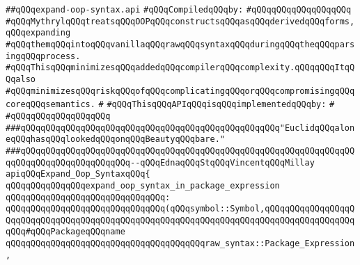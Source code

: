 \label{src/lib/compiler/front/typer/main/expand-oop-syntax.api}
\verb|##qQQqexpand-oop-syntax.api|\newline
\newline
\verb|#qQQqCompiledqQQqby:|\newline
\verb|#qQQqqQQqqQQqqQQqqQQq|\newline
\newline
\verb|#qQQqMythrylqQQqtreatsqQQqOOPqQQqconstructsqQQqasqQQqderivedqQQqforms,qQQqexpanding|\newline
\verb|#qQQqthemqQQqintoqQQqvanillaqQQqrawqQQqsyntaxqQQqduringqQQqtheqQQqparsingqQQqprocess.|\newline
\verb|#qQQqThisqQQqminimizesqQQqaddedqQQqcompilerqQQqcomplexity.qQQqqQQqItqQQqalso|\newline
\verb|#qQQqminimizesqQQqriskqQQqofqQQqcomplicatingqQQqorqQQqcompromisingqQQqcoreqQQqsemantics.|\newline
\verb|#|\newline
\verb|#qQQqThisqQQqAPIqQQqisqQQqimplementedqQQqby:|\newline
\verb|#|\newline
\verb|#qQQqqQQqqQQqqQQqqQQq|\newline
\newline
\newline
\verb|###qQQqqQQqqQQqqQQqqQQqqQQqqQQqqQQqqQQqqQQqqQQqqQQqqQQq"EuclidqQQqaloneqQQqhasqQQqlookedqQQqonqQQqBeautyqQQqbare."|\newline
\verb|###qQQqqQQqqQQqqQQqqQQqqQQqqQQqqQQqqQQqqQQqqQQqqQQqqQQqqQQqqQQqqQQqqQQqqQQqqQQqqQQqqQQqqQQqqQQq--qQQqEdnaqQQqStqQQqVincentqQQqMillay|\newline
\newline
\newline
\verb|apiqQQqExpand_Oop_SyntaxqQQq{|\newline
\newline
\verb|qQQqqQQqqQQqqQQqexpand_oop_syntax_in_package_expression|\newline
\verb|qQQqqQQqqQQqqQQqqQQqqQQqqQQqqQQq:|\newline
\verb|qQQqqQQqqQQqqQQqqQQqqQQqqQQqqQQq(qQQqsymbol::Symbol,qQQqqQQqqQQqqQQqqQQqqQQqqQQqqQQqqQQqqQQqqQQqqQQqqQQqqQQqqQQqqQQqqQQqqQQqqQQqqQQqqQQqqQQqqQQq#qQQqPackageqQQqname|\newline
\verb|qQQqqQQqqQQqqQQqqQQqqQQqqQQqqQQqqQQqqQQqraw_syntax::Package_Expression,|\newline
